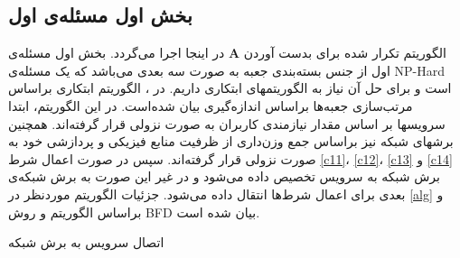 \subsection{بخش اول مسئله‌ی اول}\label{firstsub}
الگوریتم تکرار شده برای بدست آوردن $\boldsymbol{A}$ در اینجا اجرا می‌گردد. بخش اول مسئله‌ی اول از جنس بسته‌بندی جعبه به صورت سه بعدی می‌باشد که یک مسئله‌ی NP-Hard است و برای حل آن نیاز به الگوریتمهای ابتکاری داریم.
در 
\cite{3dbin}،
الگوریتم ابتکاری براساس مرتب‌سازی جعبه‌ها براساس اندازه‌گیری بیان شده‌است.
در این الگوریتم، ابتدا سرویسها بر اساس  مقدار نیازمندی کاربران به صورت نزولی قرار گرفته‌اند. همچنین برشهای شبکه نیز براساس جمع وزن‌داری از ظرفیت منابع فیزیکی و پردازشی خود به صورت نزولی قرار گرفته‌اند. سپس در صورت اعمال شرط 
\eqref{c11}،
 \eqref{c12}،
 \eqref{c13}
 و 
\eqref{c14} 
برش شبکه به سرویس تخصیص داده می‌شود و در غیر این صورت به برش شبکه‌ی بعدی برای اعمال شرط‌ها انتقال داده می‌شود.
جزئیات الگوریتم موردنظر در \ref{alg}
و براساس الگوریتم
 \cite{3dbin}
 و روش
  BFD
  بیان شده است.

	\begin{algorithm}
		\caption{اتصال سرویس به برش شبکه}\label{alg}
		\begin{latin}
		\begin{algorithmic}[1]
			
			\Else
			\EndIf
			\EndFor
			\EndFor
		\end{algorithmic}
	\end{latin}
	\end{algorithm}

